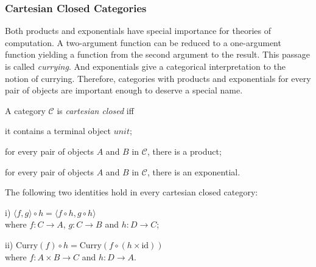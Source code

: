 \subsubsection{Cartesian Closed Categories}
\label{sec:bg_cat_ccc}
Both products and exponentials have special importance for theories of computation. A two-argument function can be reduced to a one-argument function yielding a function from the second argument to the result. This passage is called \emph{currying}. And exponentials give a categorical interpretation to the notion of currying. Therefore, categories with products and exponentials for every pair of objects are important enough to deserve a special name.

\begin{definition}
\label{definition:ccc}
A category $ \mathcal{C} $ is \emph{cartesian closed} iff
\begin{myitemize}
\item it contains a terminal object $ unit $;
\item for every pair of objects $ A $ and $ B $ in $ \mathcal{C} $, there is a product;
\item for every pair of objects $ A $ and $ B $ in $ \mathcal{C} $, there is an exponential.
\end{myitemize}
\end{definition}

\begin{proposition}
\label{proposition:eqns}
The following two identities hold in every cartesian closed category:
\begin{myitemize}
\item[i)] $ \langle f,g \rangle \circ h = \langle f \circ h , g \circ h \rangle $\\
where $ f: C \to A $, $ g: C \to B $ and $ h: D \to C $;
\item[ii)] $ \text{Curry}(f) \circ h = \text{Curry}(f \circ (h \times \text{id})) $\\
where $ f: A \times B \to C $ and $ h: D \to A $.
\end{myitemize}
\end{proposition}


